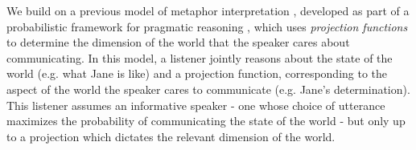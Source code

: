 \documentclass[9pt,twocolumn,twoside,lineno]{pnas-new}
\newcommand{\Listener}{L}
\newcommand{\QLONE}{\Listener_{{1}}^{{Q}}}
\begin{document}


We build on a previous model of metaphor interpretation \cite{kao}, developed as part of a probabilistic framework for pragmatic reasoning \cite{frank2012predicting}, which uses \emph{projection functions} to determine the dimension of the world that the speaker cares about communicating. In this model, a listener jointly reasons about the state of the world (e.g. what Jane is like) and a projection function, corresponding to the aspect of the world the speaker cares to communicate (e.g. Jane's determination). This listener assumes an informative speaker - one whose choice of utterance maximizes the probability of communicating the state of the world - but only up to a projection which dictates the relevant dimension of the world.





\end{document}
